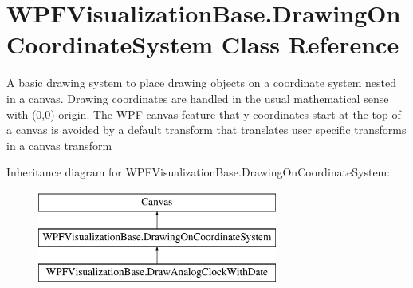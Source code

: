 \hypertarget{class_w_p_f_visualization_base_1_1_drawing_on_coordinate_system}{}\section{W\+P\+F\+Visualization\+Base.\+Drawing\+On\+Coordinate\+System Class Reference}
\label{class_w_p_f_visualization_base_1_1_drawing_on_coordinate_system}


A basic drawing system to place drawing objects on a coordinate system nested in a canvas. Drawing coordinates are handled in the usual mathematical sense with (0,0) origin. The W\+PF canvas feature that y-\/coordinates start at the top of a canvas is avoided by a default transform that translates user specific transforms in a canvas transform  


Inheritance diagram for W\+P\+F\+Visualization\+Base.\+Drawing\+On\+Coordinate\+System\+:\begin{figure}[H]
\begin{center}
\leavevmode
\includegraphics[height=3.000000cm]{class_w_p_f_visualization_base_1_1_drawing_on_coordinate_system}
\end{center}
\end{figure}

